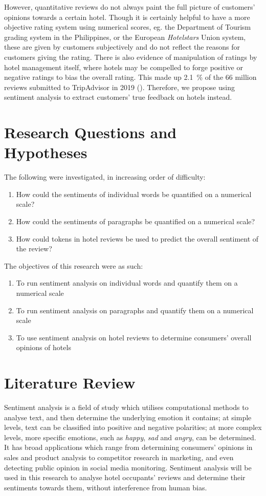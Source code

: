 \documentclass[12pt, a4paper]{pancake-article}
\begin{document}
However, quantitative reviews do not always paint the full picture of customers'
opinions towards a certain hotel. Though it is certainly helpful to have a more
objective rating system using numerical scores, eg. the Department of Tourism
grading system in the Philippines, or the European \textit{Hotelstars} Union system,
these are given by customers subjectively and do not reflect the reasons for
customers giving the rating. There is also evidence of manipulation of ratings
by hotel management itself, where hotels may be compelled to forge positive or
negative ratings to bias the overall rating. This made up \qty{2.1}{\percent}
of the 66 million reviews submitted to TripAdvisor in 2019 (\cite{tripadvisor}).
Therefore, we propose using sentiment analysis to extract customers' true
feedback on hotels instead.

\section{Research Questions and Hypotheses}
The following were investigated, in increasing order of difficulty:
\begin{enumerate}
	\item How could the sentiments of individual words be quantified on a numerical scale?
	\item How could the sentiments of paragraphs be quantified on a numerical scale?
	\item How could tokens in hotel reviews be used to predict the overall sentiment of the review?
\end{enumerate}

The objectives of this research were as such:
\begin{enumerate}
	\item To run sentiment analysis on individual words and quantify them on a numerical scale
	\item To run sentiment analysis on paragraphs and quantify them on a numerical scale
	\item To use sentiment analysis on hotel reviews to determine consumers' overall opinions of hotels
\end{enumerate}

\section{Literature Review}
Sentiment analysis is a field of study which utilises computational methods to analyse text,
and then determine the underlying emotion it contains; at simple levels, text can be classified
into positive and negative polarities; at more complex levels, more specific emotions, such as
\textit{happy}, \textit{sad} and \textit{angry}, can be determined. It
has broad applications which range from determining consumers' opinions in sales and product
analysis to competitor research in marketing, and even detecting public opinion in social media
monitoring. Sentiment analysis will be used in this research to analyse hotel occupants' reviews
and determine their sentiments towards them, without interference from human bias.
\end{document}
